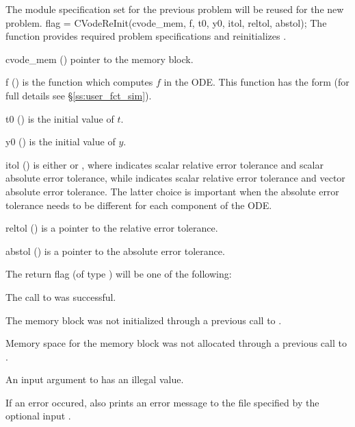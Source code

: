 The {\nvector} module specification  set for the previous problem
will be reused for the new problem.
{
  flag = CVodeReInit(cvode\_mem, f, t0, y0, itol, reltol, abstol);
}
{
  The function  provides required problem specifications 
  and reinitializes {\cvode}.
}
{
  \begin{args}[abstol]
  \item[cvode\_mem] ()
    pointer to the {\cvode} memory block.
  \item[f] ()
    is the {\C} function which computes $f$ in the ODE. This function has the form 
     (for full details see \S\ref{ss:user_fct_sim}).
  \item[t0] ()
    is the initial value of $t$.
  \item[y0] ()
    is the initial value of $y$. 
  \item[itol] () 
    is either  or , where  indicates scalar relative error 
    tolerance and scalar absolute error tolerance, while  indicates scalar
    relative error tolerance and vector absolute error tolerance. 
    The latter choice is important when the absolute error tolerance needs to
    be different for each component of the ODE. 
  \item[reltol] ()
    is a pointer to the relative error tolerance.
  \item[abstol] ()
    is a pointer to the absolute error tolerance.
  \end{args}
}
{
  The return flag  (of type ) will be one of the following:
  \begin{args}
  \item[\Id{SUCCESS}]
    The call to  was successful.
  \item[\Id{CVREI\_NO\_MEM}] 
    The {\cvode} memory block was not initialized through a 
    previous call to .
  \item[\Id{CVREI\_NO\_MALLOC}] 
    Memory space for the {\cvode} memory block was not allocated through a 
    previous call to .
  \item[\Id{CVREI\_ILL\_INPUT}] 
    An input argument to  has an illegal value.
  \end{args}
}
{
  If an error occured,  also prints an error message to the
  file specified by the optional input .
}
